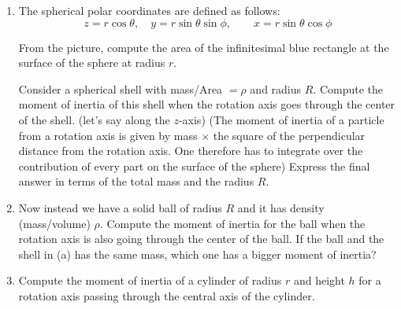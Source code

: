 \documentclass{article}
\begin{document}
\begin{problem}
\begin{enumerate}
  \item[a)] The spherical polar coordinates are defined as follows:
  \[
    z=r\cos\theta,\quad y=r\sin\theta\sin\phi,\qquad x=r\sin\theta\cos\phi
  \]
  \begin{center}
    \resizebox{0.42\linewidth}{!}{}\quad
    \resizebox{0.46\linewidth}{!}{}
  \end{center}
  From the picture, compute the area of the infinitesimal blue rectangle at the surface of the sphere at radius $r$.

  Consider a spherical shell with mass/Area $=\rho$ and radius $R$.
  Compute the moment of inertia of this shell when the rotation axis goes through the center of the shell. (let's say along the $z$-axis)
  (The moment of inertia of a particle from a rotation axis is given by mass $\times$ the square of the perpendicular distance from the rotation axis. One therefore has to integrate over the contribution of every part on the surface of the sphere)
  Express the final answer in terms of the total mass and the radius $R$.

  \item[b)] Now instead we have a solid ball of radius $R$ and it has density (mass/volume) $\rho$.
  Compute the moment of inertia for the ball when the rotation axis is also going through the center of the ball.
  If the ball and the shell in (a) has the same mass, which one has a bigger moment of inertia?
  \item[c)] Compute the moment of inertia of a cylinder of radius $r$ and height $h$ for a rotation axis passing through the central axis of the cylinder.
\end{enumerate}
\end{problem}
\end{document}
